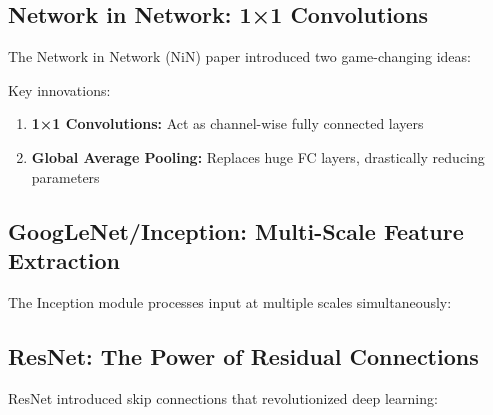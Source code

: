 \documentclass{article}
\begin{document}
\subsection{Network in Network: 1×1 Convolutions}

The Network in Network (NiN) paper introduced two game-changing ideas:


Key innovations:
\begin{enumerate}
    \item \textbf{1×1 Convolutions:} Act as channel-wise fully connected layers
    \item \textbf{Global Average Pooling:} Replaces huge FC layers, drastically reducing parameters
\end{enumerate}

\subsection{GoogLeNet/Inception: Multi-Scale Feature Extraction}

The Inception module processes input at multiple scales simultaneously:


\subsection{ResNet: The Power of Residual Connections}

ResNet introduced skip connections that revolutionized deep learning:

\end{document}

